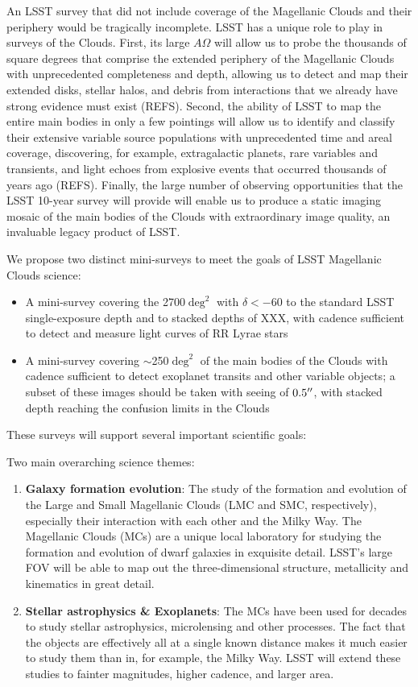 An LSST survey that did not include coverage of the Magellanic Clouds and their periphery would be tragically incomplete.  LSST has a unique role to play in surveys of the Clouds.  First, its large $A\Omega$ will allow us to probe the thousands of square degrees that comprise the extended periphery of the Magellanic Clouds with unprecedented completeness and depth, allowing us to detect and map their extended disks, stellar halos, and debris from interactions that we already have strong evidence must exist (REFS).  Second, the ability of LSST to map the entire main bodies in only a few pointings will allow us to identify and classify their extensive variable source populations with unprecedented time and areal coverage, discovering, for example, extragalactic planets, rare variables and transients, and light echoes from explosive events that occurred thousands of years ago (REFS).  Finally, the large number of observing opportunities that the LSST 10-year survey will provide will enable us to produce a static imaging mosaic of the main bodies of the Clouds with extraordinary image quality, an invaluable legacy product of LSST.

We propose two distinct mini-surveys to meet the goals of LSST Magellanic Clouds science:
\begin{itemize}
\item A mini-survey covering the 2700$\deg^2$ with $\delta < -60$ to the standard LSST single-exposure depth and to stacked depths of XXX, with cadence sufficient to detect and measure light curves of RR Lyrae stars 
\item A mini-survey covering $\sim$250$\deg^2$ of the main bodies of the Clouds with cadence sufficient to detect exoplanet transits and other variable objects; a subset of these images should be taken with seeing of $0.5''$, with stacked depth reaching the confusion limits in the Clouds
\end{itemize}

These surveys will support several important scientific goals:



Two main overarching science themes:
\begin{enumerate}
\item {\bf Galaxy formation evolution}: The study of the formation and evolution of the Large and Small
  Magellanic Clouds (LMC and SMC, respectively), especially their interaction with each other and the Milky Way.
  The Magellanic Clouds (MCs) are a unique local laboratory for studying the formation and evolution of
  dwarf galaxies in exquisite detail.  LSST's large FOV will be able to map out the three-dimensional
  structure, metallicity and kinematics in great detail.
\item {\bf Stellar astrophysics \& Exoplanets}:  The MCs have been used for decades to study stellar
  astrophysics, microlensing and other processes.  The fact that the objects are effectively all at a single
  known distance makes it much easier to study them than in, for example, the Milky Way.  LSST will extend
  these studies to fainter magnitudes, higher cadence, and larger area.
\end{enumerate}

